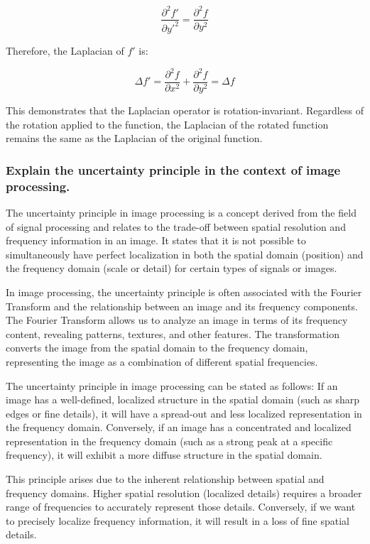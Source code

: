 \documentclass{article}
\begin{document}
\[
\frac{\partial^2 f'}{\partial y'^2} = \frac{\partial^2 f}{\partial y^2}
\]

Therefore, the Laplacian of $f'$ is:

\[
\Delta f' = \frac{\partial^2 f}{\partial x^2} + \frac{\partial^2 f}{\partial y^2} = \Delta f
\]

This demonstrates that the Laplacian operator is rotation-invariant. Regardless of the rotation applied to the function, the Laplacian of the rotated function remains the same as the Laplacian of the original function.
\subsubsection{Explain the uncertainty principle in the context of image processing.}
The uncertainty principle in image processing is a concept derived from the field of signal processing and relates to the trade-off between spatial resolution and frequency information in an image. It states that it is not possible to simultaneously have perfect localization in both the spatial domain (position) and the frequency domain (scale or detail) for certain types of signals or images.

In image processing, the uncertainty principle is often associated with the Fourier Transform and the relationship between an image and its frequency components. The Fourier Transform allows us to analyze an image in terms of its frequency content, revealing patterns, textures, and other features. The transformation converts the image from the spatial domain to the frequency domain, representing the image as a combination of different spatial frequencies.

The uncertainty principle in image processing can be stated as follows: If an image has a well-defined, localized structure in the spatial domain (such as sharp edges or fine details), it will have a spread-out and less localized representation in the frequency domain. Conversely, if an image has a concentrated and localized representation in the frequency domain (such as a strong peak at a specific frequency), it will exhibit a more diffuse structure in the spatial domain.

This principle arises due to the inherent relationship between spatial and frequency domains. Higher spatial resolution (localized details) requires a broader range of frequencies to accurately represent those details. Conversely, if we want to precisely localize frequency information, it will result in a loss of fine spatial details.
\end{document}
